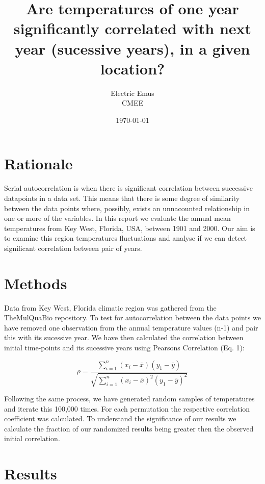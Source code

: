 \documentclass[12pt]{article}
\title{Are temperatures of one year significantly correlated with next year (sucessive years), in a given location?}
\author{Electric Emus \\ CMEE }
\date{\today}
\begin{document}
  \maketitle
  
    \section{Rationale}

    Serial autocorrelation is when there is significant correlation between successive datapoints in a data set. This means that there is some degree of similarity between the data points where, possibly, exists an unnacounted relationship in one or more of the variables.
    In this report we evaluate the annual mean temperatures from Key West, Florida, USA, between 1901 and 2000. Our aim is to examine this region temperatures fluctuations and analyse if we can detect significant correlation between pair of years.
    
  \section{Methods}

    Data from Key West, Florida climatic region was gathered from the TheMulQuaBio \cite{themulquabio_git} repository. 
    To test for autocorrelation between the data points we have removed one observation from the annual temperature values (n-1) and pair this with its sucessive year.
    We have then calculated the correlation between initial time-points and its sucessive years using Pearsons Correlation (Eq. 1):
    
    \begin{equation}
      \rho = \frac{{}\sum_{i=1}^{n} (x_i - \overline{x})(y_1 - \overline{y})}
      {\sqrt{\sum_{i=1}^{n} (x_i - \overline{x})^2(y_1 - \overline{y})^2}}
    \end{equation}
    
    Following the same process, we have generated random samples of temperatures and iterate this 100,000 times. 
    For each permutation the respective correlation coefficient was calculated.
    To understand the significance of our results we calculate the fraction of our randomized results being greater then the observed initial correlation.

  \section{Results}
\end{document}
